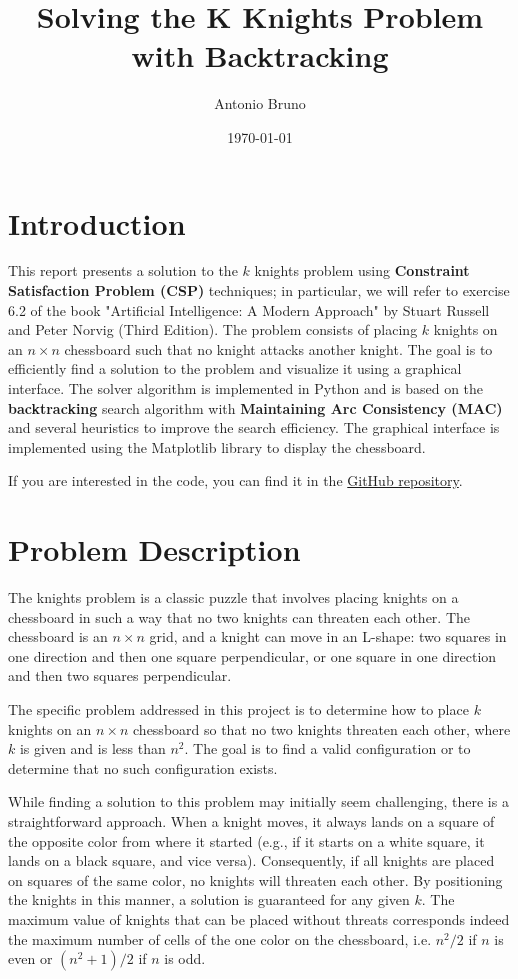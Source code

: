 \documentclass[a4paper,12pt]{article}
\title{Solving the K Knights Problem with Backtracking}
\author{Antonio Bruno}
\date{\today}
\begin{document}
\maketitle

\section{Introduction}
This report presents a solution to the \( k \) knights problem using \textbf{Constraint Satisfaction Problem (CSP)} techniques; in particular,
we will refer to exercise 6.2 of the book "Artificial Intelligence: A Modern Approach" by Stuart Russell and Peter Norvig (Third Edition).
The problem consists of placing \( k \) knights on an \( n \times n \) chessboard such that no knight attacks another knight. The goal is to efficiently find a solution to the problem and visualize it using a graphical interface.
The solver algorithm is implemented in Python and is based on the \textbf{backtracking} search algorithm with \textbf{Maintaining Arc Consistency (MAC)} and 
several heuristics to improve the search efficiency. The graphical interface is implemented using the Matplotlib library to display 
the chessboard. 

If you are interested in the code, you can find it in the \href{https://github.com/antnatb/k-knights}{GitHub repository}.

\section{Problem Description}
The knights problem is a classic puzzle that involves placing knights on a chessboard in such a way that no two knights can threaten
each other. The chessboard is an \( n \times n \) grid, and a knight can move in an L-shape: two squares in one direction and then
one square perpendicular, or one square in one direction and then two squares perpendicular.

The specific problem addressed in this project is to determine how to place \( k \) knights on an \( n \times n \) chessboard
so that no two knights threaten each other, where \( k \) is given and is less than \( n^2 \). The goal is to find a valid configuration or to determine
that no such configuration exists.

While finding a solution to this problem may initially seem challenging, there is a straightforward approach. When a knight moves, it always lands on a square of the opposite color from where it started (e.g., if it starts on a white square, it lands on a black square, and vice versa). Consequently, if all knights are placed on squares of the same color, no knights will threaten each other. By positioning the knights in this manner, a solution is guaranteed for any given \(k\). The maximum value of knights that can be placed without threats corresponds indeed the maximum number of cells of the one color on the chessboard, i.e. \( n^2 / 2\) if \( n\) is even or \( {(n^2 + 1)} / 2\) if \(n\) is odd.
\end{document}
